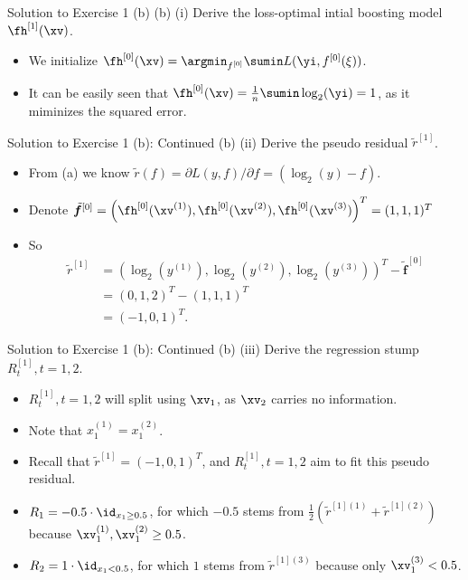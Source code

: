 \documentclass[aspectratio=169]{beamer}
\newcommand{\fhx}[1]{\fh^{[#1]}(\xv)}
\newcommand{\rtilde}[1]{\tilde{r}^{[#1]}}
\newcommand{\Rt}[1]{R_t^{[#1]}}
\newcommand{\fhv}[1]{\tilde{\bm{f}}^{[#1]}}
\begin{document}
\begin{frame}{Solution to Exercise 1 (b)}
	(b) (i) Derive the loss-optimal intial boosting model $\fhx{1}$.
	\begin{itemize}
		\item<2-> We initialize $\fhx{0} = \argmin_{f^{[0]}} \sumin L(\yi, f^{[0]}(\xi))$.
		\item<3-> It can be easily seen that $\fhx{0} = \frac{1}{n} \sumin \log_2(\yi) = 1$, as it miminizes the squared error.
	\end{itemize}
\end{frame}

\begin{frame}{Solution to Exercise 1 (b): Continued}
	(b) (ii) Derive the pseudo residual $\rtilde{1}$.
	\begin{itemize}
		\item<2-> From (a) we know $\tilde{r} (f) = \partial L(y,f) / \partial f = (\log_2(y) - f)$.
		\item<3-> Denote $\fhv{0} = \left(\fh^{[0]}(\xv^{(1)}), \fh^{[0]}(\xv^{(2)}), \fh^{[0]}(\xv^{(3)}) \right)^T = (1, 1, 1)^T$
		\item<4-> So 
			\begin{align*}
				\rtilde{1} &= \left(\log_2(y^{(1)}), \log_2(y^{(2)}), \log_2(y^{(3)})\right)^T - \fhv{0} \\
				&= (0, 1, 2)^T - (1, 1, 1)^T \\
				&= (-1, 0, 1)^T.
			\end{align*}
	\end{itemize}
\end{frame}

\begin{frame}{Solution to Exercise 1 (b): Continued}
	(b) (iii) Derive the regression stump $\Rt{1}, t = 1, 2$.
	\begin{itemize}
		\item<2-> $\Rt{1}, t = 1, 2$ will split using $\xv_1$, as $\xv_2$ carries no information.
		\item<3-> Note that $x_1^{(1)} = x_1^{(2)}$.
		\item<4-> Recall that $\rtilde{1} = (-1, 0, 1)^T$, and $\Rt{1}, t=1, 2$ aim to fit this pseudo residual.
		\item<5-> $R_1 = - 0.5 \cdot \id_{x_1 \geq 0.5}$, for which $-0.5$ stems from $\frac{1}{2}(\tilde{r}^{[1](1)} + \tilde{r}^{[1](2)})$ because $\xv_1^{(1)} , \xv_1^{(2)} \geq 0.5$.
		\item<6-> $R_2 = 1 \cdot \id_{x_1 < 0.5}$, for which $1$ stems from $\tilde{r}^{[1](3)}$ because only $\xv_1^{(3)} < 0.5$.
	\end{itemize}
\end{frame}
\end{document}
